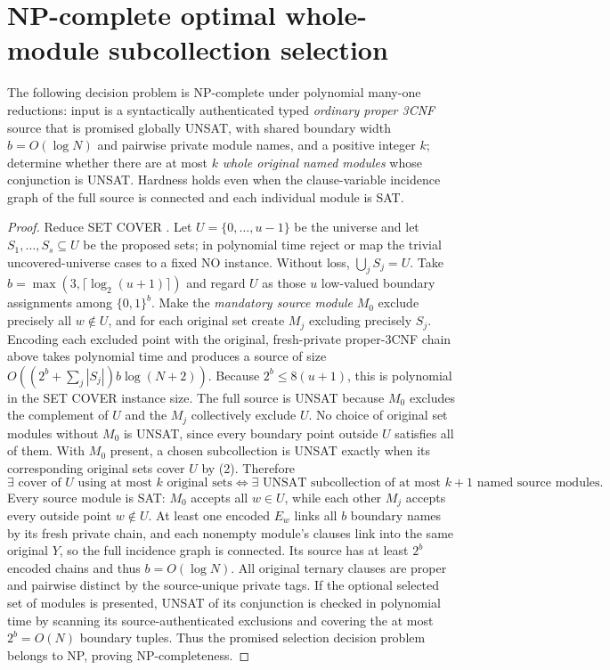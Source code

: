 \section{NP-complete optimal whole-module subcollection selection}
\begin{theorem}\label{th:setcover}
The following decision problem is NP-complete under polynomial many-one reductions: input is a syntactically authenticated typed \emph{ordinary proper 3CNF} source that is promised globally UNSAT, with shared boundary width $b=O(\log N)$ and pairwise private module names, and a positive integer $k$; determine whether there are at most $k$ \emph{whole original named modules} whose conjunction is UNSAT. Hardness holds even when the clause-variable incidence graph of the full source is connected and each individual module is SAT.
\end{theorem}
\begin{proof}
Reduce SET COVER \cite{karp}. Let $U=\{0,\dots,u-1\}$ be the universe and let $S_1,\dots,S_s\subseteq U$ be the proposed sets; in polynomial time reject or map the trivial uncovered-universe cases to a fixed NO instance. Without loss, $\bigcup_jS_j=U$. Take $b=\max(3,\lceil\log_2(u+1)\rceil)$ and regard $U$ as those $u$ low-valued boundary assignments among $\{0,1\}^b$. Make the \emph{mandatory source module} $M_0$ exclude precisely all $w\notin U$, and for each original set create $M_j$ excluding precisely $S_j$. Encoding each excluded point with the original, fresh-private proper-3CNF chain above takes polynomial time and produces a source of size $O((2^b+\sum_j|S_j|)b\log(N+2))$. Because $2^b\le8(u+1)$, this is polynomial in the SET COVER instance size. The full source is UNSAT because $M_0$ excludes the complement of $U$ and the $M_j$ collectively exclude $U$. No choice of original set modules without $M_0$ is UNSAT, since every boundary point outside $U$ satisfies all of them. With $M_0$ present, a chosen subcollection is UNSAT exactly when its corresponding original sets cover $U$ by (2). Therefore
\[
 \exists\text{ cover of }U\text{ using at most }k\text{ original sets}
 \iff
 \exists\text{ UNSAT subcollection of at most }k+1\text{ named source modules}.\tag{4}
\]
Every source module is SAT: $M_0$ accepts all $w\in U$, while each other $M_j$ accepts every outside point $w\notin U$. At least one encoded $E_w$ links all $b$ boundary names by its fresh private chain, and each nonempty module's clauses link into the same original $Y$, so the full incidence graph is connected. Its source has at least $2^b$ encoded chains and thus $b=O(\log N)$. All original ternary clauses are proper and pairwise distinct by the source-unique private tags. If the optional selected set of modules is presented, UNSAT of its conjunction is checked in polynomial time by scanning its source-authenticated exclusions and covering the at most $2^b=O(N)$ boundary tuples. Thus the promised selection decision problem belongs to NP, proving NP-completeness.\end{proof}

